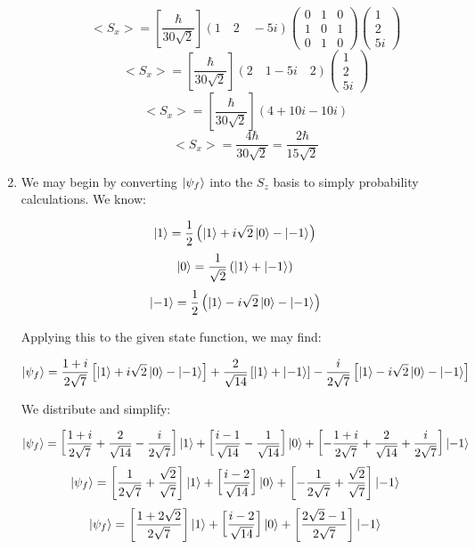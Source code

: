 \begin{enumerate}
\begin{enumerate}
          $$<S_x>=\left[ \frac{\hbar}{30\sqrt{2}} \right](1\quad 2\quad -5i)\left( \begin{matrix} 0 & 1 & 0\\ 1 & 0 & 1\\ 0 & 1 & 0\end{matrix} \right)\left( \begin{matrix}1\\2\\5i\end{matrix} \right)$$
          $$<S_x>=\left[ \frac{\hbar}{30\sqrt{2}} \right](2\quad 1-5i\quad 2)\left( \begin{matrix}1\\2\\5i\end{matrix} \right)$$
          $$<S_x>=\left[ \frac{\hbar}{30\sqrt{2}} \right](4+10i-10i)$$
          $$\boxed{<S_x>= \frac{4\hbar}{30\sqrt{2}}=\frac{2\hbar}{15\sqrt{2}}}$$

    \end{enumerate}

  \item We may begin by converting $\ket{\psi_f}$ into the $S_z$ basis to simply probability calculations. We know:

    $$\ket{1}=\frac{1}{2}\left( \ket{1}+i\sqrt{2}\ket{0}-\ket{-1} \right)$$
    $$\ket{0}=\frac{1}{\sqrt{2}}\left( \ket{1}+\ket{-1} \right)$$
    $$\ket{-1}=\frac{1}{2}\left( \ket{1}-i\sqrt{2}\ket{0}-\ket{-1} \right)$$

    Applying this to the given state function, we may find:

    $$\ket{\psi_f}=\frac{1+i}{2\sqrt{7}}\left[ \ket{1}+i\sqrt{2}\ket{0}-\ket{-1}\right]+\frac{2}{\sqrt{14}}\left[\ket{1}+\ket{-1} \right]-\frac{i}{2\sqrt{7}}\left[ \ket{1}-i\sqrt{2}\ket{0}-\ket{-1}\right]$$

    We distribute and simplify:

    $$\ket{\psi_f}=\left[\frac{1+i}{2\sqrt{7}}+\frac{2}{\sqrt{14}}-\frac{i}{2\sqrt{7}}\right]\ket{1}+\left[\frac{i-1}{\sqrt{14}}-\frac{1}{\sqrt{14}}\right]\ket{0}+\left[-\frac{1+i}{2\sqrt{7}}+\frac{2}{\sqrt{14}}+\frac{i}{2\sqrt{7}}\right]\ket{-1}$$
    $$\ket{\psi_f}=\left[\frac{1}{2\sqrt{7}}+\frac{\sqrt{2}}{\sqrt{7}}\right]\ket{1}+\left[\frac{i-2}{\sqrt{14}}\right]\ket{0}+\left[-\frac{1}{2\sqrt{7}}+\frac{\sqrt{2}}{\sqrt{7}}\right]\ket{-1}$$
    $$\ket{\psi_f}=\left[\frac{1+2\sqrt{2}}{2\sqrt{7}}\right]\ket{1}+\left[\frac{i-2}{\sqrt{14}}\right]\ket{0}+\left[\frac{2\sqrt{2}-1}{2\sqrt{7}}\right]\ket{-1}$$


\end{enumerate}
